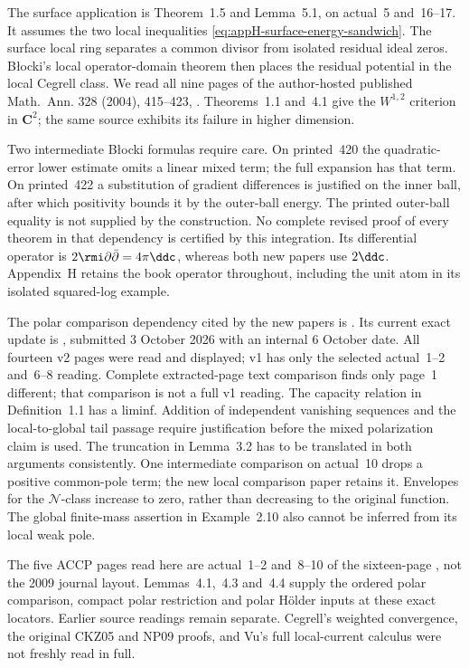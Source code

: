 The surface application is Theorem~1.5 and Lemma~5.1, on
actual~5 and~16--17. It assumes the two local inequalities
\eqref{eq:appH-surface-energy-sandwich}. The surface local ring
separates a common divisor from isolated residual ideal zeros.
Błocki's local operator-domain theorem then places the residual
potential in the local Cegrell class. We read all nine pages
of the author-hosted published Math.~Ann. 328 (2004), 415--423,
\cite{Blocki04C2Published}. Theorems~1.1 and~4.1 give the
\(W^{1,2}\) criterion in \(\mathbf C^2\); the same source
exhibits its failure in higher dimension.

Two intermediate Błocki formulas require care. On printed~420
the quadratic-error lower estimate omits a linear mixed term;
the full expansion has that term. On printed~422 a substitution
of gradient differences is justified on the inner ball, after
which positivity bounds it by the outer-ball energy. The
printed outer-ball equality is not supplied by the construction.
No complete revised proof of every theorem in that dependency
is certified by this integration. Its differential operator is
\(2\rmi\partial\bar\partial=4\pi\ddc\), whereas both new
papers use \(2\ddc\). Appendix~H retains the book operator
throughout, including the unit atom in its isolated squared-log
example.

The polar comparison dependency cited by the new papers is
\cite{DoHiep26PolarV1}. Its current exact update is
\cite{DoHiep26PolarV2}, submitted 3 October 2026 with an internal
6 October date. All fourteen v2 pages were read and displayed;
v1 has only the selected actual~1--2 and~6--8 reading.
Complete extracted-page text comparison finds only page~1
different; that comparison is not a full v1 reading. The
capacity relation in Definition~1.1 has a liminf. Addition of
independent vanishing sequences and the local-to-global tail
passage require justification before the mixed polarization
claim is used. The truncation in Lemma~3.2 has to be translated
in both arguments consistently. One intermediate comparison
on actual~10 drops a positive common-pole term; the new local
comparison paper retains it. Envelopes for the \(\mathcal N\)-class
increase to zero, rather than decreasing to the original function.
The global finite-mass assertion in Example~2.10 also cannot
be inferred from its local weak pole.

The five ACCP pages read here are actual~1--2 and~8--10 of
the sixteen-page \cite{ACCH08PolarMeasuresV3}, not the 2009
journal layout. Lemmas~4.1,~4.3 and~4.4 supply the ordered
polar comparison, compact polar restriction and polar Hölder
inputs at these exact locators. Earlier source readings remain
separate. Cegrell's weighted convergence, the original CKZ05
and NP09 proofs, and Vu's full local-current calculus were not
freshly read in full.

